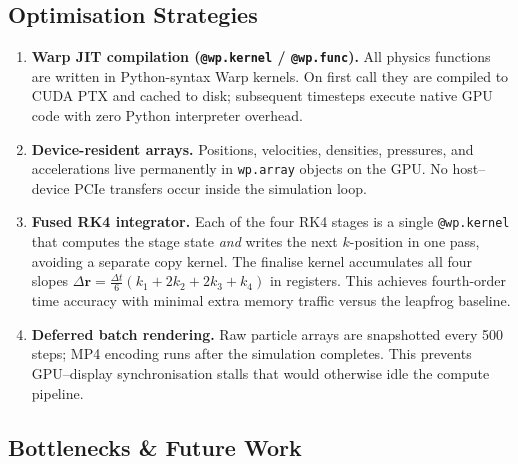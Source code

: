 \documentclass[11pt,a4paper]{article}
\begin{document}
\subsection{Optimisation Strategies}

\begin{enumerate}[leftmargin=1.5em, itemsep=4pt]

\item \textbf{Warp JIT compilation (\texttt{@wp.kernel} / \texttt{@wp.func}).}
  All physics functions are written in Python-syntax Warp kernels.
  On first call they are compiled to CUDA PTX and cached to disk;
  subsequent timesteps execute native GPU code with zero Python interpreter overhead.

\item \textbf{Device-resident arrays.}
  Positions, velocities, densities, pressures, and accelerations live permanently in
  \texttt{wp.array} objects on the GPU.
  No host–device PCIe transfers occur inside the simulation loop.

\item \textbf{Fused RK4 integrator.}
  Each of the four RK4 stages is a single \texttt{@wp.kernel} that computes the stage
  state \emph{and} writes the next $k$-position in one pass, avoiding a separate copy
  kernel. The finalise kernel accumulates all four slopes
  $\Delta \mathbf{r} = \tfrac{\Delta t}{6}(k_1 + 2k_2 + 2k_3 + k_4)$ in registers.
  This achieves fourth-order time accuracy with minimal extra memory traffic versus
  the leapfrog baseline.

\item \textbf{Deferred batch rendering.}
  Raw particle arrays are snapshotted every 500 steps; MP4 encoding runs after the
  simulation completes.
  This prevents GPU–display synchronisation stalls that would otherwise idle the
  compute pipeline.

\end{enumerate}

\subsection{Bottlenecks \& Future Work}
\end{document}
